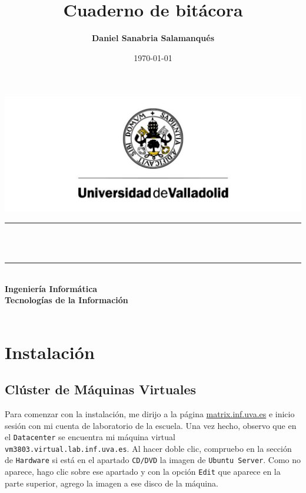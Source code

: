 \documentclass[10pt]{article}
\title{\textbf{Cuaderno de bitácora}}
\author{\textbf{\small Daniel Sanabria Salamanqués}}
\date{\today}
\makeatletter
\let\thetitle\@title
\let\theauthor\@author
\let\thedate\@date
\makeatother
\begin{document}
	
	\begin{titlepage}
		\centering
		\includegraphics[scale=0.3]{uva-3881270087.pdf}\\[0.5cm]
		\rule{\linewidth}{0.2mm}\\[0.4cm]
		{\huge\bfseries \thetitle}\\
		\rule{\linewidth}{0.2mm}\\[1.5cm]
		{\Large\bfseries Ingeniería Informática}\\[0.3cm]
		{\Large\bfseries Tecnologías de la Información}\\[1cm]
		{\Large \theauthor}\\[1.5cm]
		{\Large \thedate}
	\end{titlepage}
	
	\renewcommand{\contentsname}{Índice}
	\tableofcontents
	\clearpage
	\section{Instalación}
	
	\subsection{Clúster de Máquinas Virtuales}
	Para comenzar con la instalación, me dirijo a la página \url{matrix.inf.uva.es} e inicio sesión con mi cuenta de laboratorio de la escuela. Una vez hecho, observo que en el \verb|Datacenter| se encuentra mi máquina virtual \verb|vm3803.virtual.lab.inf.uva.es|. Al hacer doble clic, compruebo en la sección de \verb|Hardware| si está en el apartado \verb|CD/DVD| la imagen de \verb|Ubuntu Server|. Como no aparece, hago clic sobre ese apartado y con la opción \verb|Edit| que aparece en la parte superior, agrego la imagen a ese disco de la máquina.
	
\end{document}
